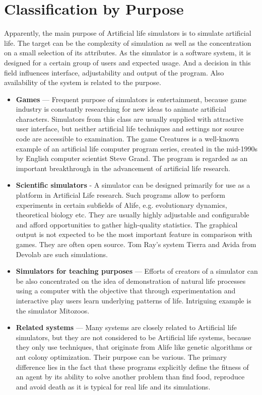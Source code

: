 \documentclass[a4paper,12pt]{report}
\begin{document}
\section{Classification by Purpose}
Apparently, the main purpose of Artificial life simulators is to simulate artificial life. The target can be the complexity of simulation as well as the concentration on a small selection of its attributes. As the simulator is a software system, it is designed for a certain group of users and expected usage. And a decision in this field influences interface, adjustability and output of the program. Also availability of the system is related to the purpose. 
\begin{itemize}
  \item \textbf{Games} --- Frequent purpose of simulators is entertainment, because game industry is constantly researching for new ideas to animate artificial characters. Simulators from this class are usually supplied with attractive user interface, but neither artificial life techniques and settings nor source code are accessible to examination. The game Creatures is a well-known example of an artificial life computer program series, created in the mid-1990s by English computer scientist Steve Grand. The program is regarded as an important breakthrough in the advancement of artificial life research.
  \item \textbf{Scientific simulators} - A simulator can be designed primarily for use as a platform in Artificial Life research. Such programs allow to perform experiments in certain subfields of Alife, e.g. evolutionary dynamics, theoretical biology etc. They are usually highly adjustable and configurable and afford opportunities to gather high-quality statistics. The graphical output is not expected to be the most important feature in comparison with games. They are often open source. Tom Ray's system Tierra and Avida from Devolab are such simulations. 
  \item \textbf{Simulators for teaching purposes} --- Efforts of creators of a simulator can be also concentrated on the idea of demonstration of natural life processes using a computer with the objective that through experimentation and interactive play users learn underlying patterns of life. Intriguing example is the simulator Mitozoos. 
\item \textbf{Related systems} --- Many systems are closely related to Artificial life simulators, but they are not considered to be Artificial life systems, because they only use techniques, that originate from Alife like genetic algorithms or ant colony optimization. Their purpose can be various. The primary difference lies in the fact that these programs explicitly define the fitness of an agent by its ability to solve another problem than find food, reproduce and avoid death as it is typical for real life and its simulations. 
\end{itemize}
\end{document}
